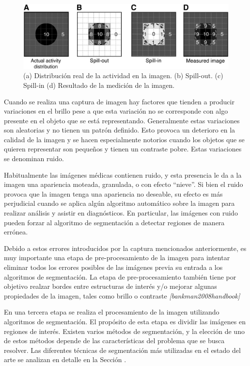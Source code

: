 \begin{figure}[h!]
\centering
\includegraphics[scale=0.15]{images/spill.jpg}
\caption{(a) Distribución real de la actividad en la imagen. (b) Spill-out. (c) Spill-in (d) Resultado de la medición de la imagen.}
\label{fig:spill}
\end{figure}

Cuando se realiza una captura de imagen hay factores que tienden a producir variaciones en el brillo pese a que esta variación no se corresponde con algo presente en el objeto que se está representando. Generalmente estas variaciones son aleatorias y no tienen un patrón definido. Esto provoca un deterioro en la calidad de la imagen y se hacen especialmente notorios cuando los objetos que se quieren representar son pequeños y tienen un contraste pobre. Estas variaciones se denominan ruido.

Habitualmente las imágenes médicas contienen ruido, y esta presencia le da a la imagen una apariencia moteada, granulada, o con efecto “nieve”. Si bien el ruido provoca que la imagen tenga una apariencia no deseable, su efecto es más perjudicial cuando se aplica algún algoritmo automático sobre la imagen para realizar análisis y asistir en diagnósticos. En particular, las imágenes con ruido pueden forzar al algoritmo de segmentación a detectar regiones de manera errónea.

Debido a estos errores introducidos por la captura mencionados anteriormente, es muy importante una etapa de pre-procesamiento de la imagen para intentar eliminar todos los errores posibles de las imágenes previa su entrada a los algoritmos de segmentación. La etapa de pre-procesamiento también tiene por objetivo realzar bordes entre estructuras de interés y/o mejorar algunas propiedades de la imagen, tales como brillo o contraste \emph{[bankman2008handbook]}

En una tercera etapa se realiza el procesamiento de la imagen utilizando algoritmos de segmentación. El propósito de esta etapa es dividir las imágenes en regiones de interés. Existen varios métodos de segmentación, y la elección de uno de estos métodos depende de las características del problema que se busca resolver. Las diferentes técnicas de segmentación más utilizadas en el estado del arte se analizan en detalle en la Sección \label{section:algoritmos}.

